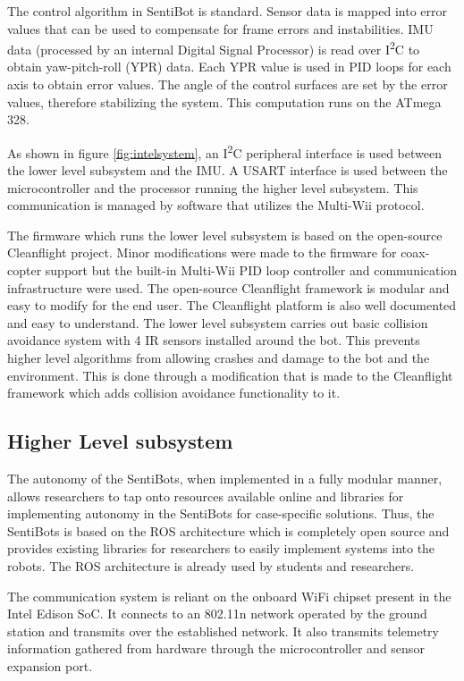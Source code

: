 \documentclass[12pt]{article}
\begin{document}
The control algorithm in SentiBot is standard. Sensor data is mapped into error values that can be used to compensate for frame errors and instabilities. IMU data (processed by an internal Digital Signal Processor) is read over I\textsuperscript{2}C to obtain yaw-pitch-roll (YPR) data. Each YPR value is used in PID loops for each axis to obtain error values. The angle of the control surfaces are set by the error values, therefore stabilizing the system. This computation runs on the ATmega 328.

As shown in figure \ref{fig:intelsystem}, an I\textsuperscript{2}C peripheral interface is used between the lower level subsystem and the IMU. A USART interface is used between the microcontroller and the processor running the higher level subsystem. This communication is managed by software that utilizes the Multi-Wii protocol\cite{SFV}.

The firmware which runs the lower level subsystem is based on the open-source Cleanflight project. Minor modifications were made to the firmware for coax-copter support but the built-in Multi-Wii PID loop controller and communication infrastructure were used. The open-source Cleanflight framework is modular and easy to modify for the end user. The Cleanflight platform is also well documented and easy to understand. The lower level subsystem carries out basic collision avoidance system with 4 IR sensors installed around the bot. This prevents higher level algorithms from allowing crashes and damage to the bot and the environment. This is done through a modification that is made to the Cleanflight framework which adds collision avoidance functionality to it.

\subsection{Higher Level subsystem}

The autonomy of the SentiBots, when implemented in a fully modular manner, allows researchers to tap onto resources available online and libraries for implementing autonomy in the SentiBots for case-specific solutions. Thus, the SentiBots is based on the ROS architecture which is completely open source and provides existing libraries for researchers to easily implement systems into the robots. The ROS architecture is already used by students and researchers.

The communication system is reliant on the onboard WiFi chipset present in the Intel Edison SoC. It connects to an 802.11n network operated by the ground station and transmits over the established network. It also transmits telemetry information gathered from hardware through the microcontroller and sensor expansion port.
\end{document}
